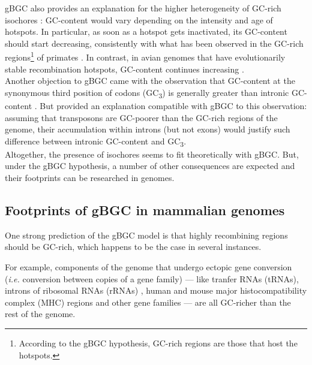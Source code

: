 gBGC also provides an explanation for the higher heterogeneity of GC-rich isochores \citep{clay2001compositional,clay2001compositionala}: GC-content would vary depending on the intensity and age of hotspots.
In particular, as soon as a hotspot gets inactivated, its GC-content should start decreasing, consistently with what has been observed in the GC-rich regions\footnote{According to the gBGC hypothesis, GC-rich regions are those that host the hotspots.} of primates \citep{duret2002vanishing,belle2004decline,meunier2004recombination,duret2006gc}.
In contrast, in avian genomes that have evolutionarily stable recombination hotspots, GC-content continues increasing \citep{webster2006strong,capra2011substitution,mugal2013twisted}.\\


Another objection to gBGC \citep{eyre-walker1999evidence} came with the observation that GC-content at the synonymous third position of codons (GC\textsubscript{3}) is generally greater than intronic GC-content \citep{clay1996human}.
But \citet{duret2001elevated} provided an explanation compatible with gBGC to this observation: assuming that transposons are GC-poorer than the GC-rich regions of the genome, their accumulation within introns (but not exons) would justify such difference between intronic GC-content and GC\textsubscript{3}.\\

Altogether, the presence of isochores seems to fit theoretically with gBGC\@.
But, under the gBGC hypothesis, a number of other consequences are expected and their footprints can be researched in genomes.



\subsection{Footprints of gBGC in mammalian genomes}

One strong prediction of the gBGC model is that highly recombining regions should be GC-rich, which happens to be the case in several instances.

For example, components of the genome that undergo ectopic gene conversion (\textit{i.e.} conversion between copies of a gene family) — like tranfer RNAs (tRNAs), introns of ribosomal RNAs (rRNAs) \citep{galtier2001gccontent}, human and mouse major histocompatibility complex (MHC) regions \citep{hogstrand1999gene} and other gene families \citep{backstrom2005gene,galtier2003gene,kudla2004gene} — are all GC-richer than the rest of the genome.

